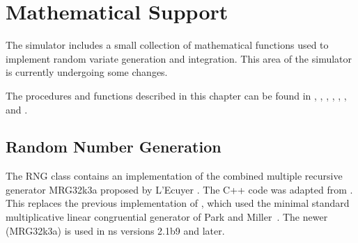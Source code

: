 %
%

\chapter{Mathematical Support}
\label{chap:math}

The simulator includes a small collection of mathematical
functions used to implement random variate generation and integration.
This area of the simulator is currently undergoing some
changes.

The procedures and functions described in this chapter can be found in
,
,
,
,
,
, and
.


\section{Random Number Generation}
\label{sec:random}

The RNG class contains an implementation of the combined multiple
recursive generator MRG32k3a proposed by L'Ecuyer
\cite{lecuyer99}. The C++ code was adapted from \cite{lecuyer01}.
This replaces the previous implementation of , which used
the minimal standard multiplicative linear congruential generator of
Park and Miller~\cite{Park88:Random}.  The newer (MRG32k3a)  is
used in ns versions 2.1b9 and later.

